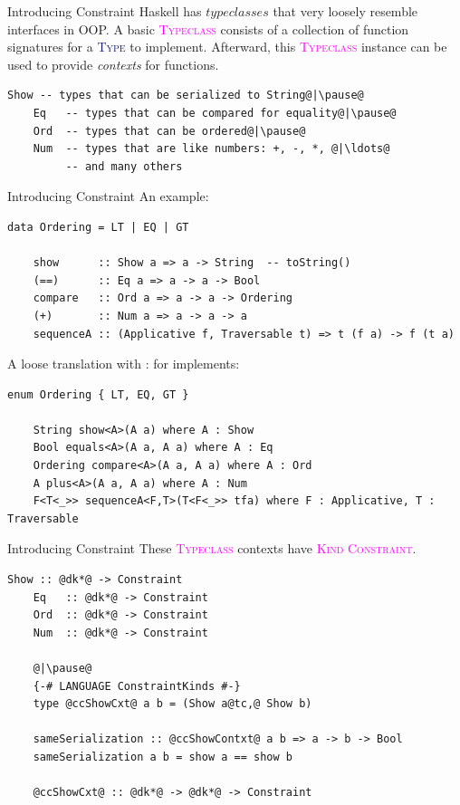 \documentclass[xcolor={usenames,dvipsnames}]{beamer}
\newcommand{\htycon}[1]{\textcolor{MidnightBlue}{\textsc{#1}}}
\newcommand{\hkind}[1]{\textcolor{Fuchsia}{\textsc{#1}}}
\newcommand{\hclass}[1]{\textcolor{Magenta}{\textsc{#1}}}
\begin{document}
\begin{frame}[fragile]{Introducing Constraint}
  Haskell has $typeclasses$ that very loosely resemble interfaces in OOP. A basic \hclass{Typeclass} consists of a collection of function signatures for a \htycon{Type} to implement. Afterward, this \hclass{Typeclass} instance can be used to provide \textit{contexts} for functions.
  \pause
  \begin{lstlisting}[style=hask]
    Show -- types that can be serialized to String@|\pause@
    Eq   -- types that can be compared for equality@|\pause@
    Ord  -- types that can be ordered@|\pause@
    Num  -- types that are like numbers: +, -, *, @|\ldots@
         -- and many others
  \end{lstlisting}
\end{frame}

\begin{frame}[fragile]{Introducing Constraint}
  An example:
  \begin{lstlisting}[style=hask]
    data Ordering = LT | EQ | GT

    show      :: Show a => a -> String  -- toString()
    (==)      :: Eq a => a -> a -> Bool
    compare   :: Ord a => a -> a -> Ordering
    (+)       :: Num a => a -> a -> a
    sequenceA :: (Applicative f, Traversable t) => t (f a) -> f (t a)
  \end{lstlisting}

  \pause
  A loose translation with : for implements:
  \begin{lstlisting}[style=hask]
    enum Ordering { LT, EQ, GT }

    String show<A>(A a) where A : Show
    Bool equals<A>(A a, A a) where A : Eq
    Ordering compare<A>(A a, A a) where A : Ord
    A plus<A>(A a, A a) where A : Num
    F<T<_>> sequenceA<F,T>(T<F<_>> tfa) where F : Applicative, T : Traversable
  \end{lstlisting}
\end{frame}

\begin{frame}[fragile]{Introducing Constraint}
  These \hclass{Typeclass} contexts have \hkind{Kind} \hkind{Constraint}.
  \begin{lstlisting}[style=hask]
    Show :: @dk*@ -> Constraint
    Eq   :: @dk*@ -> Constraint
    Ord  :: @dk*@ -> Constraint
    Num  :: @dk*@ -> Constraint

    @|\pause@
    {-# LANGUAGE ConstraintKinds #-}
    type @ccShowCxt@ a b = (Show a@tc,@ Show b)

    sameSerialization :: @ccShowContxt@ a b => a -> b -> Bool
    sameSerialization a b = show a == show b

    @ccShowCxt@ :: @dk*@ -> @dk*@ -> Constraint
  \end{lstlisting}
\end{frame}
\end{document}
